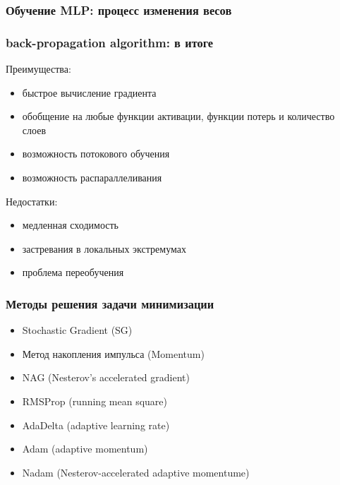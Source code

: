 \documentclass[11pt]{beamer}
\begin{document}
	\begin{frame}
		\frametitle{Обучение MLP: процесс изменения весов }
		
		\begin{figure}[h]
		\end{figure}
		
	\end{frame}

	
	\begin{frame}
		\frametitle{back-propagation algorithm: в итоге}
		{\color{blue} Преимущества:} 
			\begin{itemize}
				\item быстрое вычисление градиента
				\item обобщение на любые функции активации, функции потерь и количество слоев
				\item возможность потокового обучения
				\item возможность распараллеливания
			\end{itemize}
		
		{\color{blue} Недостатки:} 
		\begin{itemize}
			\item медленная сходимость
			\item застревания в локальных экстремумах
			\item проблема переобучения
		\end{itemize}
	
	
	\end{frame}

	\begin{frame}
		\frametitle{Методы решения задачи минимизации}
		
		\begin{itemize}
			\item Stochastic Gradient (SG)
			\item Метод накопления импульса (Momentum)
			\item NAG (Nesterov's accelerated gradient)
			\item RMSProp (running mean square)
			\item AdaDelta (adaptive learning rate)
			\item Adam (adaptive momentum)
			\item Nadam (Nesterov-accelerated adaptive momentume)
		\end{itemize}
	
	\end{frame}
	
\end{document}
